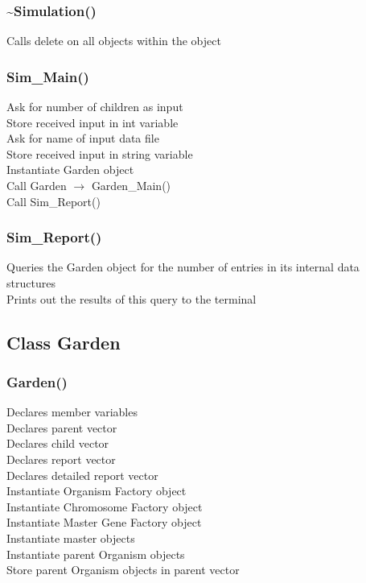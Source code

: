 \documentclass{article}
\begin{document}
\subsubsection{\textasciitilde Simulation()}
\indent Calls delete on all objects within the object

\subsubsection{Sim\_Main()}
\indent Ask for number of children as input\\
\indent Store received input in int variable \\
\indent Ask for name of input data file\\
\indent Store received input in string variable \\
\indent Instantiate Garden object\\
\indent Call Garden $\rightarrow$ Garden\_Main() \\
\indent Call Sim\_Report() \\

\subsubsection{Sim\_Report()}
\indent Queries the Garden object for the number of entries in its internal data structures\\
\indent Prints out the results of this query to the terminal\\

\newpage
\subsection{Class Garden}

\subsubsection{Garden()}
\indent Declares member variables\\
\indent Declares parent vector \\
\indent Declares child vector \\
\indent Declares report vector \\
\indent Declares detailed report vector \\
\indent Instantiate Organism Factory object\\
\indent Instantiate Chromosome Factory object\\
\indent Instantiate Master Gene Factory object\\
\indent Instantiate master objects\\
\indent Instantiate parent Organism objects\\
\indent Store parent Organism objects in parent vector\\
\end{document}
